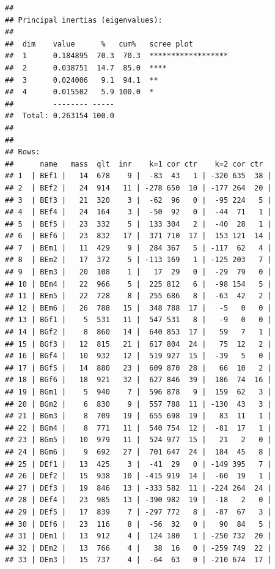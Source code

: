 \documentclass[
  finnish,
]{book}
\begin{document}
\begin{verbatim}
## 
## Principal inertias (eigenvalues):
## 
##  dim    value      %   cum%   scree plot               
##  1      0.184895  70.3  70.3  ******************       
##  2      0.038751  14.7  85.0  ****                     
##  3      0.024006   9.1  94.1  **                       
##  4      0.015502   5.9 100.0  *                        
##         -------- -----                                 
##  Total: 0.263154 100.0                                 
## 
## 
## Rows:
##      name   mass  qlt  inr    k=1 cor ctr    k=2 cor ctr  
## 1  | BEf1 |   14  678    9 |  -83  43   1 | -320 635  38 |
## 2  | BEf2 |   24  914   11 | -278 650  10 | -177 264  20 |
## 3  | BEf3 |   21  320    3 |  -62  96   0 |  -95 224   5 |
## 4  | BEf4 |   24  164    3 |  -50  92   0 |  -44  71   1 |
## 5  | BEf5 |   23  332    5 |  133 304   2 |  -40  28   1 |
## 6  | BEf6 |   23  832   17 |  371 710  17 |  153 121  14 |
## 7  | BEm1 |   11  429    9 |  284 367   5 | -117  62   4 |
## 8  | BEm2 |   17  372    5 | -113 169   1 | -125 203   7 |
## 9  | BEm3 |   20  108    1 |   17  29   0 |  -29  79   0 |
## 10 | BEm4 |   22  966    5 |  225 812   6 |  -98 154   5 |
## 11 | BEm5 |   22  728    8 |  255 686   8 |  -63  42   2 |
## 12 | BEm6 |   26  788   15 |  348 788  17 |   -5   0   0 |
## 13 | BGf1 |    5  531   11 |  547 531   8 |   -9   0   0 |
## 14 | BGf2 |    8  860   14 |  640 853  17 |   59   7   1 |
## 15 | BGf3 |   12  815   21 |  617 804  24 |   75  12   2 |
## 16 | BGf4 |   10  932   12 |  519 927  15 |  -39   5   0 |
## 17 | BGf5 |   14  880   23 |  609 870  28 |   66  10   2 |
## 18 | BGf6 |   18  921   32 |  627 846  39 |  186  74  16 |
## 19 | BGm1 |    5  940    7 |  596 878   9 |  159  62   3 |
## 20 | BGm2 |    6  830    9 |  557 788  11 | -130  43   3 |
## 21 | BGm3 |    8  709   19 |  655 698  19 |   83  11   1 |
## 22 | BGm4 |    8  771   11 |  540 754  12 |  -81  17   1 |
## 23 | BGm5 |   10  979   11 |  524 977  15 |   21   2   0 |
## 24 | BGm6 |    9  692   27 |  701 647  24 |  184  45   8 |
## 25 | DEf1 |   13  425    3 |  -41  29   0 | -149 395   7 |
## 26 | DEf2 |   15  938   10 | -415 919  14 |  -60  19   1 |
## 27 | DEf3 |   19  846   13 | -333 582  11 | -224 264  24 |
## 28 | DEf4 |   23  985   13 | -390 982  19 |  -18   2   0 |
## 29 | DEf5 |   17  839    7 | -297 772   8 |  -87  67   3 |
## 30 | DEf6 |   23  116    8 |  -56  32   0 |   90  84   5 |
## 31 | DEm1 |   13  912    4 |  124 180   1 | -250 732  20 |
## 32 | DEm2 |   13  766    4 |   38  16   0 | -259 749  22 |
## 33 | DEm3 |   15  737    4 |  -64  63   0 | -210 674  17 |

\end{verbatim}
\end{document}
